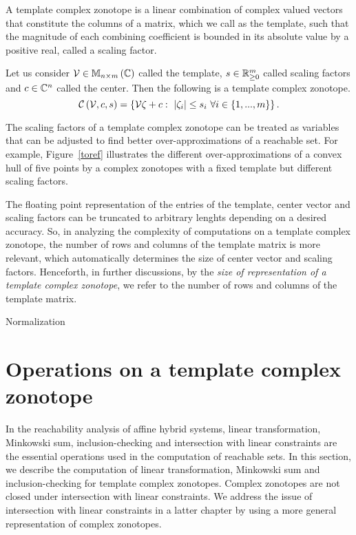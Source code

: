 A template complex zonotope is a linear combination of complex valued
vectors that constitute the columns of a matrix, which we call as the
template, such that the magnitude of each combining coefficient is
bounded in its absolute value by a positive real, called a scaling factor.
%
\begin{definition}
Let us consider $\mathcal{V}\in\mathbb{M}_{n\times m}\left(\mathbb{C}\right)$ called the template,
$s\in\mathbb{R}^m_{\geq 0}$ called scaling factors and
$c\in\mathbb{C}^n$ called the center.  Then the following is a template
complex zonotope.
%
\begin{equation}
\mathit{\mathcal{C}}\left(\mathcal{V},c,s\right)
= \left\{\mathcal{V}\zeta+c:~\left|\zeta_i\right|\leq s_i~\forall
i\in\left\{1,...,m\right\}\right\}.
\end{equation}
\end{definition}
%
The scaling factors of a template complex zonotope can be treated as
variables that can be adjusted to find better over-approximations of a
reachable set.  For example, Figure~\ref{toref} illustrates the
different over-approximations of a convex hull of five points by a
complex zonotopes with a fixed template but different scaling factors.

The floating point representation of the entries of the template,
center vector and scaling factors can be truncated to arbitrary
lenghts depending on a desired accuracy.  So, in
analyzing the complexity of computations on a template complex
zonotope, the number of rows and columns of the template matrix is
more relevant, which automatically determines the size of center
vector and scaling factors.  Henceforth, in further discussions,
by the {\it size of representation of a template complex zonotope}, we
refer to the number of rows and columns of the
template matrix.

{\color{red} Normalization}
%
\section{Operations on a template complex zonotope}
In the reachability analysis of affine hybrid systems, linear
transformation, Minkowski sum, inclusion-checking and intersection
with linear constraints are the essential operations used in the
computation of reachable sets.  In this section, we describe the
computation of linear transformation, Minkowski sum and
inclusion-checking for template complex zonotopes.  Complex zonotopes
are not closed under intersection with linear constraints.  We address
the issue of intersection with linear constraints in a latter chapter
by using a more general representation of complex zonotopes.

